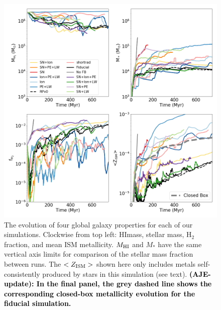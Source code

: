 \documentclass[twocolumn]{aastex62}
\newcommand{\HI}{HI}
\newcommand{\changed}[1]{\textcolor{black}{\textbf{(AJE-update): #1}}}
\begin{document}
\begin{figure}
  \centering
  \includegraphics[width=0.98\linewidth]{figures/physics_comparison_masses}
  \caption{The evolution of four global galaxy properties for each of our simulations. Clockwise from top left: \HI mass, stellar mass, H$_2$ fraction, and mean ISM metallicity. $M_{\rm \HI}$ and $M_{*}$ have the same vertical axis limits for comparison of the stellar mass fraction between runs. The $<Z_{\rm ISM}>$ shown here only includes metals self-consistently produced by stars in this simulation (see text). \changed{In the final panel, the grey dashed line shows the corresponding closed-box metallicity evolution for the fiducial simulation.}}
  \label{fig:properties}
\end{figure}
\end{document}
